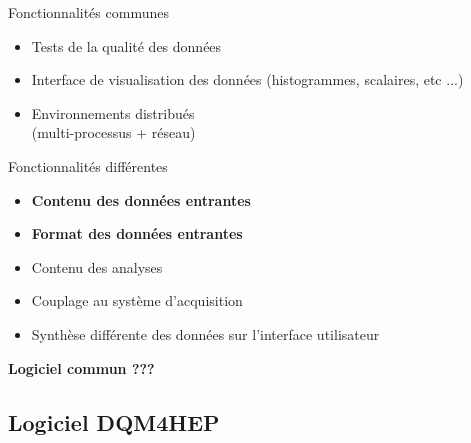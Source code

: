 \documentclass[8pt]{beamer}
\begin{document}
\begin{frame}
\begin{minipage}{0.47\linewidth}
\begin{block}{Fonctionnalités communes}
\begin{itemize}
          \item Tests de la qualité des données
          \item Interface de visualisation des données (histogrammes, scalaires, etc ...)
          \item Environnements distribués \\(multi-processus + réseau)
        \end{itemize}
      \end{block}
    \end{minipage} \hfill
    \begin{minipage}{0.47\linewidth}
      \pause
      \begin{block}{Fonctionnalités différentes}
        \begin{itemize}
          \item \textbf{Contenu des données entrantes}
          \item \textbf{Format des données entrantes}
          \item Contenu des analyses
          \item Couplage au système d'acquisition
          \item Synthèse différente des données sur l'interface utilisateur
        \end{itemize}
      \end{block}
    \end{minipage}
    \pause
    \begin{center} \textbf{Logiciel commun ???} \end{center}
  \end{frame}


  \subsection{Logiciel DQM4HEP}
\end{document}
